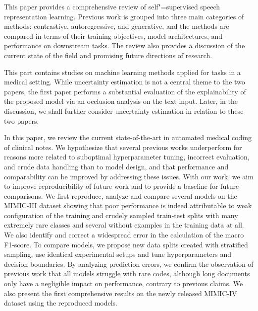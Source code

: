 This paper provides a comprehensive review of self"=supervised speech representation learning. Previous work is grouped into three main categories of methods: contrastive, autoregressive, and generative, and the methods are compared in terms of their training objectives, model architectures, and performance on downstream tasks. The review also provides a discussion of the current state of the field and promising future directions of research. 

 
This part contains studies on machine learning methods applied for tasks in a medical setting. While uncertainty estimation is not a central theme to the two papers, the first paper performs a substantial evaluation of the explainability of the proposed model via an occlusion analysis on the text input. Later, in the discussion, we shall further consider uncertainty estimation in relation to these two papers.

In this paper, we review the current state-of-the-art in automated medical coding of clinical notes. 
We hypothesize that several previous works underperform for reasons more related to suboptimal hyperparameter tuning, incorrect evaluation, and crude data handling than to model design, and that performance and comparability can be improved by addressing these issues. 
With our work, we aim to improve reproducibility of future work and to provide a baseline for future comparisons. 
We first reproduce, analyze and compare several models on the MIMIC-III dataset showing that poor performance is indeed attributable to weak configuration of the training and crudely sampled train-test splits with many extremely rare classes and several without examples in the training data at all. 
We also identify and correct a widespread error in the calculation of the macro F1-score. 
To compare models, we propose new data splits created with stratified sampling, use identical experimental setups and tune hyperparameters and decision boundaries. 
By analyzing prediction errors, we confirm the observation of previous work that all models struggle with rare codes, although long documents only have a negligible impact on performance, contrary to previous claims. 
We also present the first comprehensive results on the newly released MIMIC-IV dataset using the reproduced models. 

